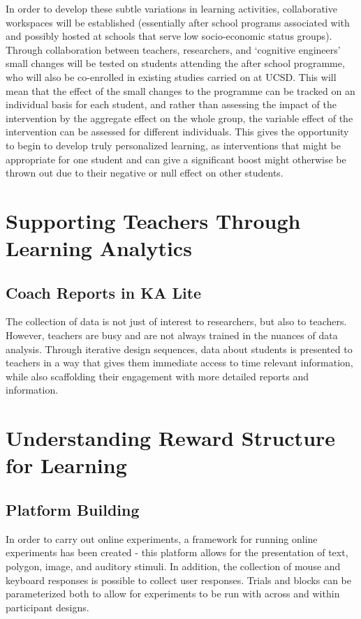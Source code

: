 \documentclass[12pt,a4paper,titlepage]{scrreprt}
\begin{document}
In order to develop these subtle variations in learning activities, collaborative workspaces will be established (essentially after school programs associated with and possibly hosted at schools that serve low socio-economic status groups). Through collaboration between teachers, researchers, and `cognitive engineers' small changes will be tested on students attending the after school programme, who will also be co-enrolled in existing studies carried on at UCSD. This will mean that the effect of the small changes to the programme can be tracked on an individual basis for each student, and rather than assessing the impact of the intervention by the aggregate effect on the whole group, the variable effect of the intervention can be assessed for different individuals. This gives the opportunity to begin to develop truly personalized learning, as interventions that might be appropriate for one student and can give a significant boost might otherwise be thrown out due to their negative or null effect on other students.

\section{Supporting Teachers Through Learning Analytics}
\subsection{Coach Reports in KA Lite}

The collection of data is not just of interest to researchers, but also to teachers. However, teachers are busy and are not always trained in the nuances of data analysis. Through iterative design sequences, data about students is presented to teachers in a way that gives them immediate access to time relevant information, while also scaffolding their engagement with more detailed reports and information.

\section{Understanding Reward Structure for Learning}
\subsection{Platform Building}
In order to carry out online experiments, a framework for running online experiments has been created - this platform allows for the presentation of text, polygon, image, and auditory stimuli. In addition, the collection of mouse and keyboard responses is possible to collect user responses. Trials and blocks can be parameterized both to allow for experiments to be run with across and within participant designs.
\end{document}
